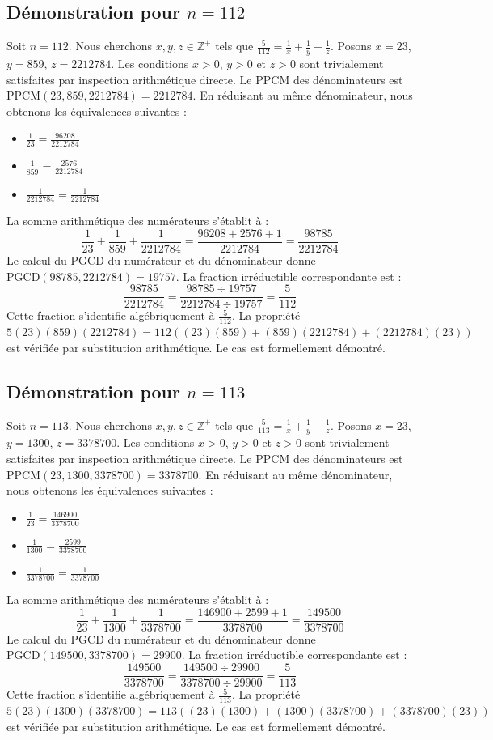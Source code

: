 \documentclass[12pt,a4paper]{article}
\begin{document}
\subsection{Démonstration pour $n = 112$}
Soit $n = 112$. Nous cherchons $x, y, z \in \mathbb{Z}^{+}$ tels que $\frac{5}{112} = \frac{1}{x} + \frac{1}{y} + \frac{1}{z}$.
Posons $x = 23$, $y = 859$, $z = 2212784$.
Les conditions $x > 0$, $y > 0$ et $z > 0$ sont trivialement satisfaites par inspection arithmétique directe.
Le PPCM des dénominateurs est $\text{PPCM}(23, 859, 2212784) = 2212784$.
En réduisant au même dénominateur, nous obtenons les équivalences suivantes :
\begin{itemize}
    \item $\frac{1}{23} = \frac{96208}{2212784}$
    \item $\frac{1}{859} = \frac{2576}{2212784}$
    \item $\frac{1}{2212784} = \frac{1}{2212784}$
\end{itemize}
La somme arithmétique des numérateurs s'établit à :
$$ \frac{1}{23} + \frac{1}{859} + \frac{1}{2212784} = \frac{96208 + 2576 + 1}{2212784} = \frac{98785}{2212784} $$
Le calcul du PGCD du numérateur et du dénominateur donne $\text{PGCD}(98785, 2212784) = 19757$.
La fraction irréductible correspondante est :
$$ \frac{98785}{2212784} = \frac{98785 \div 19757}{2212784 \div 19757} = \frac{5}{112} $$
Cette fraction s'identifie algébriquement à $\frac{5}{112}$.
La propriété $5(23)(859)(2212784) = 112((23)(859) + (859)(2212784) + (2212784)(23))$ est vérifiée par substitution arithmétique.
Le cas est formellement démontré.

\subsection{Démonstration pour $n = 113$}
Soit $n = 113$. Nous cherchons $x, y, z \in \mathbb{Z}^{+}$ tels que $\frac{5}{113} = \frac{1}{x} + \frac{1}{y} + \frac{1}{z}$.
Posons $x = 23$, $y = 1300$, $z = 3378700$.
Les conditions $x > 0$, $y > 0$ et $z > 0$ sont trivialement satisfaites par inspection arithmétique directe.
Le PPCM des dénominateurs est $\text{PPCM}(23, 1300, 3378700) = 3378700$.
En réduisant au même dénominateur, nous obtenons les équivalences suivantes :
\begin{itemize}
    \item $\frac{1}{23} = \frac{146900}{3378700}$
    \item $\frac{1}{1300} = \frac{2599}{3378700}$
    \item $\frac{1}{3378700} = \frac{1}{3378700}$
\end{itemize}
La somme arithmétique des numérateurs s'établit à :
$$ \frac{1}{23} + \frac{1}{1300} + \frac{1}{3378700} = \frac{146900 + 2599 + 1}{3378700} = \frac{149500}{3378700} $$
Le calcul du PGCD du numérateur et du dénominateur donne $\text{PGCD}(149500, 3378700) = 29900$.
La fraction irréductible correspondante est :
$$ \frac{149500}{3378700} = \frac{149500 \div 29900}{3378700 \div 29900} = \frac{5}{113} $$
Cette fraction s'identifie algébriquement à $\frac{5}{113}$.
La propriété $5(23)(1300)(3378700) = 113((23)(1300) + (1300)(3378700) + (3378700)(23))$ est vérifiée par substitution arithmétique.
Le cas est formellement démontré.
\end{document}
